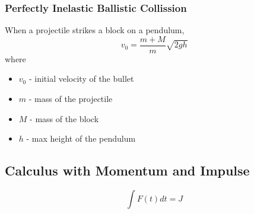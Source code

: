 \documentclass[titlepage]{article}
\begin{document}
\subsubsection{Perfectly Inelastic Ballistic Collission}
When a projectile strikes a block on a pendulum,
\begin{equation*}
    v_0 = \frac{m + M}{m}\sqrt{2gh}
\end{equation*}
where
\begin{itemize}
    \item $v_0$ - initial velocity of the bullet
    \item $m$ - mass of the projectile
    \item $M$ - mass of the block
    \item $h$ - max height of the pendulum
\end{itemize}

\subsection{Calculus with Momentum and Impulse}
\begin{equation*}
    \int F(t) dt = J
\end{equation*}
\end{document}
